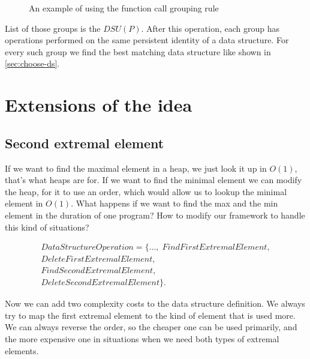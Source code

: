 \documentclass[a4paper,11pt]{article}
\begin{document}
        \begin{figure}[h]
            

            \caption{An example of using the function call grouping rule}

            \label{fig:function-call-grouping}
        \end{figure}

        \clearpage

		List of those groups is the $DSU(P)$. After this operation, each group has operations performed on the
		same persistent identity of a data structure. For every such group we find the best matching data
		structure like shown in \autoref{sec:choose-ds}.


\pagebreak

\section{Extensions of the idea}

	\subsection{Second extremal element}

		If we want to find the maximal element in a heap, we just look it up in $O(1)$, that's what heaps are
		for.  If we want to find the minimal element we can modify the heap, for it to use an order, which would
		allow us to lookup the minimal element in $O(1)$.  What happens if we want to find the max and the min
		element in the duration of one program?  How to modify our framework to handle this kind of situations?

		\begin{eqnarray*}
			DataStructureOperation = \{\dots, \; FindFirstExtremalElement,\\
			DeleteFirstExtremalElement,\\
			FindSecondExtremalElement,\\
			DeleteSecondExtremalElement\}.
		\end{eqnarray*}

        Now we can add two complexity costs to the data structure definition. We always try to map the first extremal
        element to the kind of element that is used more. We can always reverse the order, so the cheaper one can be
        used primarily, and the more expensive one in situations when we need both types of extremal elements.
\end{document}
